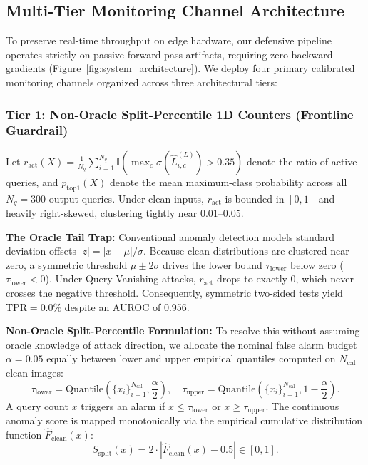\documentclass[preprint,12pt]{elsarticle}
\begin{document}
\subsection{Multi-Tier Monitoring Channel Architecture}
To preserve real-time throughput on edge hardware, our defensive pipeline operates strictly on passive forward-pass artifacts, requiring zero backward gradients (Figure~\ref{fig:system_architecture}). We deploy four primary calibrated monitoring channels organized across three architectural tiers:

\subsubsection{Tier 1: Non-Oracle Split-Percentile 1D Counters (Frontline Guardrail)}
Let $r_{\mathrm{act}}(X) = \frac{1}{N_q} \sum_{i=1}^{N_q} \mathbb{I}(\max_c \sigma(\hat{L}_{i,c}^{(L)}) > 0.35)$ denote the ratio of active queries, and $\bar{p}_{\mathrm{top1}}(X)$ denote the mean maximum-class probability across all $N_q = 300$ output queries. Under clean inputs, $r_{\mathrm{act}}$ is bounded in $[0, 1]$ and heavily right-skewed, clustering tightly near $0.01$--$0.05$.

\textbf{The Oracle Tail Trap:} Conventional anomaly detection models standard deviation offsets $|z| = |x - \mu| / \sigma$. Because clean distributions are clustered near zero, a symmetric threshold $\mu \pm 2\sigma$ drives the lower bound $\tau_{\mathrm{lower}}$ below zero ($\tau_{\mathrm{lower}} < 0$). Under Query Vanishing attacks, $r_{\mathrm{act}}$ drops to exactly 0, which never crosses the negative threshold. Consequently, symmetric two-sided tests yield $\mathrm{TPR} = 0.0\%$ despite an AUROC of 0.956.

\textbf{Non-Oracle Split-Percentile Formulation:} To resolve this without assuming oracle knowledge of attack direction, we allocate the nominal false alarm budget $\alpha = 0.05$ equally between lower and upper empirical quantiles computed on $N_{\mathrm{cal}}$ clean images:
\begin{equation}
    \tau_{\mathrm{lower}} = \mathrm{Quantile}\left(\{x_i\}_{i=1}^{N_{\mathrm{cal}}}, \frac{\alpha}{2}\right), \quad \tau_{\mathrm{upper}} = \mathrm{Quantile}\left(\{x_i\}_{i=1}^{N_{\mathrm{cal}}}, 1 - \frac{\alpha}{2}\right).
\end{equation}
A query count $x$ triggers an alarm if $x \le \tau_{\mathrm{lower}}$ or $x \ge \tau_{\mathrm{upper}}$. The continuous anomaly score is mapped monotonically via the empirical cumulative distribution function $\hat{F}_{\mathrm{clean}}(x)$:
\begin{equation}
    S_{\mathrm{split}}(x) = 2 \cdot \left| \hat{F}_{\mathrm{clean}}(x) - 0.5 \right| \in [0, 1].
\end{equation}
\end{document}
